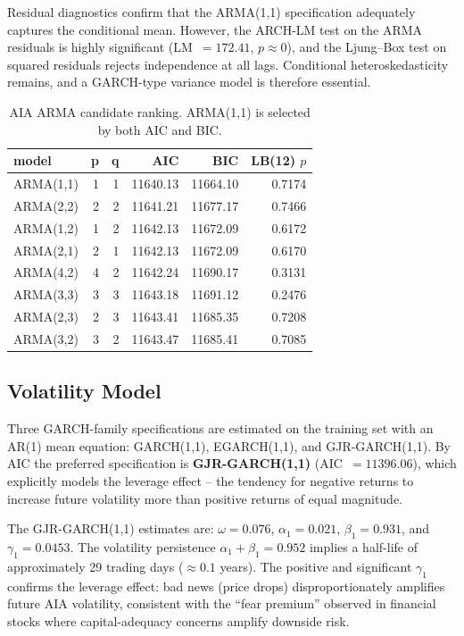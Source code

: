 \documentclass[11pt,a4paper]{article}
\begin{document}
Residual diagnostics confirm that the ARMA(1,1) specification adequately
captures the conditional mean.  However, the ARCH-LM test on the ARMA
residuals is highly significant (LM~$=172.41$, $p \approx 0$), and the
Ljung--Box test on squared residuals rejects independence at all lags.
Conditional heteroskedasticity remains, and a GARCH-type variance model
is therefore essential.

\begin{table}[H]
\centering
\small
\begin{tabular}{lrrrrr}
\toprule
model & p & q & AIC & BIC & LB(12) $p$ \\
\midrule
ARMA(1,1) & 1 & 1 & 11640.13 & 11664.10 & 0.7174 \\
ARMA(2,2) & 2 & 2 & 11641.21 & 11677.17 & 0.7466 \\
ARMA(1,2) & 1 & 2 & 11642.13 & 11672.09 & 0.6172 \\
ARMA(2,1) & 2 & 1 & 11642.13 & 11672.09 & 0.6170 \\
ARMA(4,2) & 4 & 2 & 11642.24 & 11690.17 & 0.3131 \\
ARMA(3,3) & 3 & 3 & 11643.18 & 11691.12 & 0.2476 \\
ARMA(2,3) & 2 & 3 & 11643.41 & 11685.35 & 0.7208 \\
ARMA(3,2) & 3 & 2 & 11643.47 & 11685.41 & 0.7085 \\
\bottomrule
\end{tabular}
\caption{AIA ARMA candidate ranking.  ARMA(1,1) is selected by both AIC and BIC.}
\label{tab:aia-arma}
\end{table}

\subsection{Volatility Model}
Three GARCH-family specifications are estimated on the training set with
an AR(1) mean equation: GARCH(1,1), EGARCH(1,1), and GJR-GARCH(1,1).
By AIC the preferred specification is \textbf{GJR-GARCH(1,1)}
(AIC~$=11396.06$), which explicitly models the leverage effect -- the
tendency for negative returns to increase future volatility more than
positive returns of equal magnitude.

The GJR-GARCH(1,1) estimates are: $\omega = 0.076$, $\alpha_1 = 0.021$,
$\beta_1 = 0.931$, and $\gamma_1 = 0.0453$.  The volatility persistence
$\alpha_1 + \beta_1 = 0.952$ implies a half-life of approximately 29
trading days ($\approx 0.1$ years).  The positive and significant
$\gamma_1$ confirms the leverage effect: bad news (price drops)
disproportionately amplifies future AIA volatility, consistent with the
``fear premium'' observed in financial stocks where capital-adequacy
concerns amplify downside risk.
\end{document}
